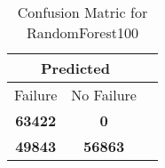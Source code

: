 \begin{table}[] 
\caption{Confusion Matric for RandomForest100} 
\label{Table: Prediction Accuracy-NoneRandomForest100DecisionTrees100EKF-ignoresolarPanelDipole-solarPanelDipole} 
\centering 
\begin{tabular} 
 {@{}ccc@{}} 
\toprule 
\multicolumn{2}{c}{\textbf{Predicted}}
 \\ \midrule 
\multicolumn{1}{|c|}{Failure} & 
\multicolumn{1}{c|}{No Failure}
 \\ \midrule 
\multicolumn{1}{|c|}{\color{green}\textbf{63422}} & 
\multicolumn{1}{c|}{\color{red}\textbf{0}}
 \\ \midrule 
\multicolumn{1}{|c|}{\color{red}\textbf{49843}} & 
\multicolumn{1}{c|}{\color{green}\textbf{56863}}
 \\ \bottomrule 
\end{tabular} 
\end{table} 
